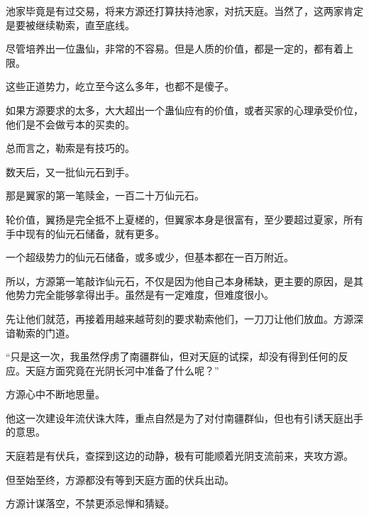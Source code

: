 \begin{this_body}
池家毕竟是有过交易，将来方源还打算扶持池家，对抗天庭。当然了，这两家肯定是要被继续勒索，直至底线。

尽管培养出一位蛊仙，非常的不容易。但是人质的价值，都是一定的，都有着上限。

这些正道势力，屹立至今这么多年，也都不是傻子。

如果方源要求的太多，大大超出一个蛊仙应有的价值，或者买家的心理承受价位，他们是不会做亏本的买卖的。

总而言之，勒索是有技巧的。

数天后，又一批仙元石到手。

那是翼家的第一笔赎金，一百二十万仙元石。

轮价值，翼扬是完全抵不上夏槎的，但翼家本身是很富有，至少要超过夏家，所有手中现有的仙元石储备，就有更多。

一个超级势力的仙元石储备，或多或少，但基本都在一百万附近。

所以，方源第一笔敲诈仙元石，不仅是因为他自己本身稀缺，更主要的原因，是其他势力完全能够拿得出手。虽然是有一定难度，但难度很小。

先让他们就范，再接着用越来越苛刻的要求勒索他们，一刀刀让他们放血。方源深谙勒索的门道。

“只是这一次，我虽然俘虏了南疆群仙，但对天庭的试探，却没有得到任何的反应。天庭方面究竟在光阴长河中准备了什么呢？”

方源心中不断地思量。

他这一次建设年流伏诛大阵，重点自然是为了对付南疆群仙，但也有引诱天庭出手的意思。

天庭若是有伏兵，查探到这边的动静，极有可能顺着光阴支流前来，夹攻方源。

但至始至终，方源都没有等到天庭方面的伏兵出动。

方源计谋落空，不禁更添忌惮和猜疑。

\end{this_body}

